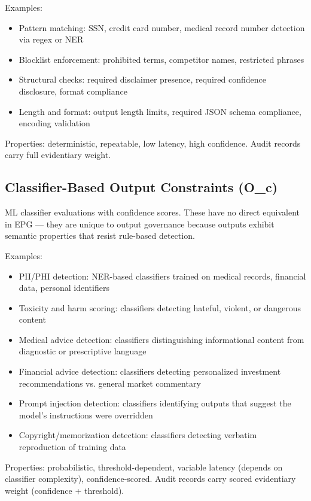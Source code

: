 Examples:

\begin{itemize}
  \item Pattern matching: SSN, credit card number, medical record number detection via regex or NER
  \item Blocklist enforcement: prohibited terms, competitor names, restricted phrases
  \item Structural checks: required disclaimer presence, required confidence disclosure, format compliance
  \item Length and format: output length limits, required JSON schema compliance, encoding validation
\end{itemize}


Properties: deterministic, repeatable, low latency, high confidence. Audit records carry full evidentiary weight.

\subsection{Classifier-Based Output Constraints (O\_c)}


ML classifier evaluations with confidence scores. These have no direct equivalent in EPG --- they are unique to output governance because outputs exhibit semantic properties that resist rule-based detection.

Examples:

\begin{itemize}
  \item PII/PHI detection: NER-based classifiers trained on medical records, financial data, personal identifiers
  \item Toxicity and harm scoring: classifiers detecting hateful, violent, or dangerous content
  \item Medical advice detection: classifiers distinguishing informational content from diagnostic or prescriptive language
  \item Financial advice detection: classifiers detecting personalized investment recommendations vs. general market commentary
  \item Prompt injection detection: classifiers identifying outputs that suggest the model's instructions were overridden
  \item Copyright/memorization detection: classifiers detecting verbatim reproduction of training data
\end{itemize}


Properties: probabilistic, threshold-dependent, variable latency (depends on classifier complexity), confidence-scored. Audit records carry scored evidentiary weight (confidence + threshold).

